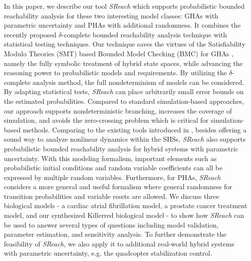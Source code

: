 \vspace{-.2cm}
In this paper, we describe our tool {\it SReach} which supports probabilistic bounded reachability analysis for these two interesting model classes: GHAs with parametric uncertainty and PHAs with additional randomness. It combines the recently proposed $\delta$-complete bounded reachability analysis technique \cite{gaodelta} with statistical testing techniques. Our technique saves the virtues of the Satisfiability Modulo Theories (SMT) based Bounded Model Checking (BMC) for GHAs \cite{cordeiro2012smt, tinelli2012smt}, namely the fully symbolic treatment of hybrid state spaces, while advancing the reasoning power to probabilistic models and requirements. By utilizing the $\delta$-complete analysis method, the full nondeterminism of models can be considered. By adapting statistical tests, {\it SReach} can place arbitrarily small error bounds on the estimated probabilities. Compared to standard simulation-based approaches, our approach supports nondeterministic branching, increases the coverage of simulation, and avoids the zero-crossing problem which is critical for simulation-based methods. Comparing to the existing tools introduced in \cite{zhang2012safety, franzle2008stochastic, david2012statistical, website:prism}, besides offering a sound way to analyze nonlinear dynamics within the SHSs, {\it SReach} also supports probabilistic bounded reachability analysis for hybrid systems with parametric uncertainty. With this modeling formalism, important elements such as probabilistic initial conditions and random variable coefficients can all be expressed by multiple random variables. Furthermore, for PHAs, {\it SReach} considers a more general and useful formalism where general randomness for transition probabilities and variable resets are allowed. We discuss three biological models - a cardiac atrial fibrillation model, a prostate cancer treatment model, and our synthesized Killerred biological model - to show how {\it SReach} can be used to answer several types of questions including model validation, parameter estimation, and sensitivity analysis. To further demonstrate the feasibility of {\it SReach}, we also apply it to additional real-world hybrid systems with parametric uncertainty, e.g. the quadcopter stabilization control.


